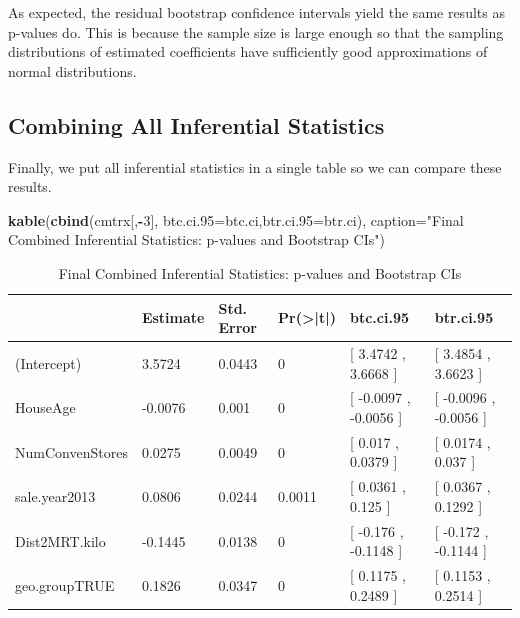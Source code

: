 \documentclass[
]{book}
\newenvironment{Shaded}{\begin{snugshade}}{\end{snugshade}}
\newcommand{\AttributeTok}[1]{\textcolor[rgb]{0.13,0.29,0.53}{#1}}
\newcommand{\DecValTok}[1]{\textcolor[rgb]{0.00,0.00,0.81}{#1}}
\newcommand{\FunctionTok}[1]{\textcolor[rgb]{0.13,0.29,0.53}{\textbf{#1}}}
\newcommand{\NormalTok}[1]{#1}
\newcommand{\SpecialCharTok}[1]{\textcolor[rgb]{0.81,0.36,0.00}{\textbf{#1}}}
\newcommand{\StringTok}[1]{\textcolor[rgb]{0.31,0.60,0.02}{#1}}
\begin{document}
As expected, the residual bootstrap confidence intervals yield the same results as p-values do. This is because the sample size is large enough so that the sampling distributions of estimated coefficients have sufficiently good approximations of normal distributions.

\hypertarget{combining-all-inferential-statistics}{%
\subsection{Combining All Inferential Statistics}\label{combining-all-inferential-statistics}}

Finally, we put all inferential statistics in a single table so we can compare these results.

\begin{Shaded}
\begin{Highlighting}[]
\FunctionTok{kable}\NormalTok{(}\FunctionTok{cbind}\NormalTok{(cmtrx[,}\SpecialCharTok{{-}}\DecValTok{3}\NormalTok{], }\AttributeTok{btc.ci.95=}\NormalTok{btc.ci,}\AttributeTok{btr.ci.95=}\NormalTok{btr.ci), }
      \AttributeTok{caption=}\StringTok{"Final Combined Inferential Statistics: p{-}values and Bootstrap CIs"}\NormalTok{)}
\end{Highlighting}
\end{Shaded}

\begin{table}

\caption{\label{tab:unnamed-chunk-112}Final Combined Inferential Statistics: p-values and Bootstrap CIs}
\centering
\begin{tabular}[t]{l|l|l|l|l|l}
\hline
  & Estimate & Std. Error & Pr(>|t|) & btc.ci.95 & btr.ci.95\\
\hline
(Intercept) & 3.5724 & 0.0443 & 0 & [ 3.4742 ,  3.6668 ] & [ 3.4854 ,  3.6623 ]\\
\hline
HouseAge & -0.0076 & 0.001 & 0 & [ -0.0097 ,  -0.0056 ] & [ -0.0096 ,  -0.0056 ]\\
\hline
NumConvenStores & 0.0275 & 0.0049 & 0 & [ 0.017 ,  0.0379 ] & [ 0.0174 ,  0.037 ]\\
\hline
sale.year2013 & 0.0806 & 0.0244 & 0.0011 & [ 0.0361 ,  0.125 ] & [ 0.0367 ,  0.1292 ]\\
\hline
Dist2MRT.kilo & -0.1445 & 0.0138 & 0 & [ -0.176 ,  -0.1148 ] & [ -0.172 ,  -0.1144 ]\\
\hline
geo.groupTRUE & 0.1826 & 0.0347 & 0 & [ 0.1175 ,  0.2489 ] & [ 0.1153 ,  0.2514 ]\\
\hline
\end{tabular}
\end{table}
\end{document}
